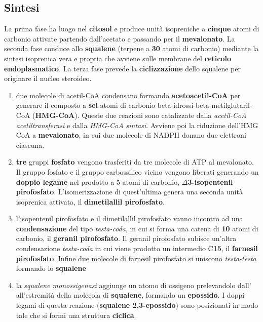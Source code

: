 \documentclass[a4paper, 12pt]{article}
\begin{document}
\begin{titlepage}
\subsection{Sintesi}
La prima fase ha luogo nel \textbf{citosol} e produce unità isopreniche a \textbf{cinque} atomi di carbonio attivate partendo dall’acetato e passando per il \textbf{mevalonato}. La seconda fase conduce allo \textbf{squalene} (terpene a \textbf{30} atomi di carbonio) mediante la sintesi isoprenica vera e propria che avviene sulle membrane del \textbf{reticolo endoplasmatico}. La terza fase prevede la \textbf{ciclizzazione} dello squalene per originare il nucleo steroideo.
\begin{enumerate}
\item due molecole di acetil-CoA condensano formando \textbf{acetoacetil-CoA} per generare il composto a \textbf{sei} atomi di carbonio beta-idrossi-beta-metilglutaril-CoA (\textbf{HMG-CoA}). Queste due reazioni sono catalizzate dalla \textit{acetil-CoA acetiltransferasi} e dalla \textit{HMG-CoA sintasi}. Avviene poi la riduzione dell’HMG CoA a \textbf{mevalonato}, in cui due molecole di NADPH donano due elettroni ciascuna.
\item \textbf{tre} gruppi \textbf{fosfato} vengono trasferiti da tre molecole di ATP al mevalonato. Il gruppo fosfato e il gruppo carbossilico vicino vengono liberati generando un \textbf{doppio legame} nel prodotto a 5 atomi di carbonio, \textbf{$\Delta$3-isopentenil pirofosfato}. L’isomerizzazione di quest’ultima genera una seconda unità isoprenica attivata, il \textbf{dimetilallil pirofosfato}.
\item l’isopentenil pirofosfato e il dimetilallil pirofosfato vanno incontro ad una \textbf{condensazione} del tipo \textit{testa-coda}, in cui si forma una catena di \textbf{10} atomi di carbonio, il \textbf{geranil pirofosfato}. Il geranil pirofosfato subisce un’altra condensazione \textit{testa-coda} in cui viene prodotto un intermedio C\textbf{15}, il \textbf{farnesil pirofosfato}. Infine due molecole di farnesil pirofosfato si uniscono \textit{testa-testa} formando lo \textbf{squalene}
\item la \textit{squalene monossigenasi} aggiunge un atomo di ossigeno prelevandolo dall’ all’estremità della molecola di \textbf{squalene}, formando un \textbf{epossido}. I doppi legami di questa reazione (\textbf{squalene 2,3-epossido}) sono posizionati in modo tale che si formi una struttura \textbf{ciclica}.
\end{enumerate}


\end{titlepage}
\end{document}
